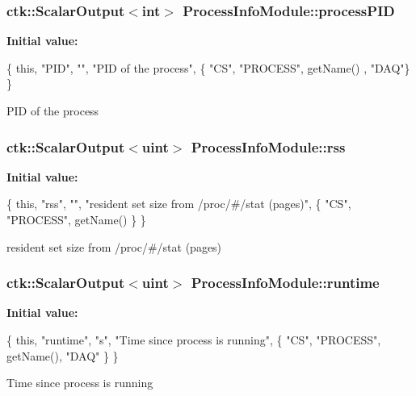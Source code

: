 \subsubsection[{\texorpdfstring{process\+P\+ID}{processPID}}]{\setlength{\rightskip}{0pt plus 5cm}ctk\+::\+Scalar\+Output$<$int$>$ Process\+Info\+Module\+::process\+P\+ID}\hypertarget{structProcessInfoModule_aae5355d8100a201888fd835a7515f456}{}\label{structProcessInfoModule_aae5355d8100a201888fd835a7515f456}
{\bfseries Initial value\+:}
\begin{DoxyCode}
\{ \textcolor{keyword}{this}, \textcolor{stringliteral}{"PID"}, \textcolor{stringliteral}{""}, \textcolor{stringliteral}{"PID of the process"},
    \{ \textcolor{stringliteral}{"CS"}, \textcolor{stringliteral}{"PROCESS"}, getName() , \textcolor{stringliteral}{"DAQ"}\} \}
\end{DoxyCode}
P\+ID of the process 
\subsubsection[{\texorpdfstring{rss}{rss}}]{\setlength{\rightskip}{0pt plus 5cm}ctk\+::\+Scalar\+Output$<$uint$>$ Process\+Info\+Module\+::rss}\hypertarget{structProcessInfoModule_a3d74cbbee14a01fa4ac85d56180f593f}{}\label{structProcessInfoModule_a3d74cbbee14a01fa4ac85d56180f593f}
{\bfseries Initial value\+:}
\begin{DoxyCode}
\{ \textcolor{keyword}{this}, \textcolor{stringliteral}{"rss"}, \textcolor{stringliteral}{""}, \textcolor{stringliteral}{"resident set size from /proc/#/stat (pages)"},
    \{ \textcolor{stringliteral}{"CS"}, \textcolor{stringliteral}{"PROCESS"}, getName() \} \}
\end{DoxyCode}
resident set size from /proc/\#/stat (pages) 
\subsubsection[{\texorpdfstring{runtime}{runtime}}]{\setlength{\rightskip}{0pt plus 5cm}ctk\+::\+Scalar\+Output$<$uint$>$ Process\+Info\+Module\+::runtime}\hypertarget{structProcessInfoModule_a8c11129c477f0177e253f3ce414d0fc3}{}\label{structProcessInfoModule_a8c11129c477f0177e253f3ce414d0fc3}
{\bfseries Initial value\+:}
\begin{DoxyCode}
\{ \textcolor{keyword}{this}, \textcolor{stringliteral}{"runtime"}, \textcolor{stringliteral}{"s"}, \textcolor{stringliteral}{"Time since process is running"},
    \{ \textcolor{stringliteral}{"CS"}, \textcolor{stringliteral}{"PROCESS"}, getName(), \textcolor{stringliteral}{"DAQ"} \} \}
\end{DoxyCode}
Time since process is running 
